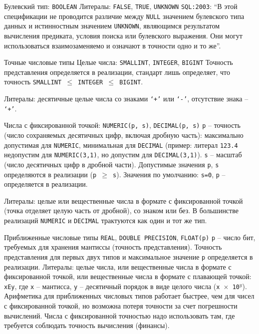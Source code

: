 \documentclass[a4paper,12pt]{article}
\begin{document}
Булевский тип:  
\texttt{BOOLEAN}  
Литералы: \texttt{FALSE}, \texttt{TRUE}, \texttt{UNKNOWN}  
\texttt{SQL:2003}: ``В этой спецификации не проводится различие между \texttt{NULL} значением булевского типа данных и истинностным значением \texttt{UNKNOWN}, являющимся результатом вычисления предиката, условия поиска или булевского выражения. Они могут использоваться взаимозаменяемо и означают в точности одно и то же''.

Точные числовые типы  
Целые числа: \texttt{SMALLINT}, \texttt{INTEGER}, \texttt{BIGINT}  
Точность представления определяется в реализации, стандарт лишь определяет, что точность \texttt{SMALLINT $\leq$ INTEGER $\leq$ BIGINT}.

Литералы: десятичные целые числа со знаками \texttt{‘+’} или \texttt{‘-’}, отсутствие знака – \texttt{‘+’}.

Числа с фиксированной точкой:  
\texttt{NUMERIC(p, s)}, \texttt{DECIMAL(p, s)}  
\texttt{p} – точность (число сохраняемых десятичных цифр, включая дробную часть): максимально допустимая для \texttt{NUMERIC}, минимальная для \texttt{DECIMAL} (пример: литерал \texttt{123.4} недопустим для \texttt{NUMERIC(3,1)}, но допустим для \texttt{DECIMAL(3,1)}).  
\texttt{s} – масштаб (число десятичных цифр в дробной части).  
Допустимые значения \texttt{p}, \texttt{s} определяются в реализации (\texttt{p $\geq$ s}).  
Значения по умолчанию: \texttt{s=0}, \texttt{p} – определяется в реализации.

Литералы: целые или вещественные числа в формате с фиксированной точкой (точка отделяет целую часть от дробной), со знаком или без.  
В большинстве реализаций \texttt{NUMERIC} и \texttt{DECIMAL} трактуются как один и тот же тип.

Приближенные числовые типы  
\texttt{REAL}, \texttt{DOUBLE PRECISION}, \texttt{FLOAT(p)}  
\texttt{p} – число бит, требуемых для хранения мантиссы (точность представления).  
Точность представления для первых двух типов и максимальное значение \texttt{p} определяется в реализации.  
Литералы: целые числа, или вещественные числа в формате с фиксированной точкой, или вещественные числа в формате с плавающей точкой: \texttt{xEy}, где \texttt{x} – мантисса, \texttt{y} – десятичный порядок в виде целого числа (\texttt{x $\times$ 10$^y$}).  
Арифметика для приближенных числовых типов работает быстрее, чем для чисел с фиксированной точкой, но возможна потеря точности за счет погрешности вычислений.  
Числа с фиксированной точностью надо использовать там, где требуется соблюдать точность вычисления (финансы).
\end{document}
